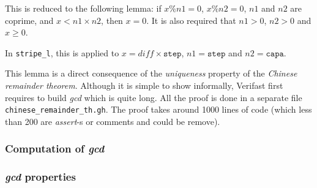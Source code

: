 \documentclass[oneside]{article}
\begin{document}
This is reduced to the following lemma: if $x\%n1 = 0$, $x\%n2 = 0$, $n1$ and $n2$ are coprime, and $x < n1 \times n2$, then $x = 0$. It is also required that $n1 > 0$, $n2 > 0$ and $x \geq 0$.

In \texttt{stripe\_l}, this is applied to $x = diff\times \mathtt{step}$, $n1 = \mathtt{step}$ and $n2 = \mathtt{capa}$.

This lemma is a direct consequence of the \emph{uniqueness} property of the \emph{Chinese remainder theorem}. Although it is simple to show informally, Verifast first requires to build \emph{gcd} which is quite long. All the proof is done in a separate file \texttt{chinese\_remainder\_th.gh}. The proof takes around 1000 lines of code (which less than 200 are \emph{assert}-s or comments and could be remove).

\subsubsection{Computation of \emph{gcd}}
\subsubsection{\emph{gcd} properties}
\end{document}
